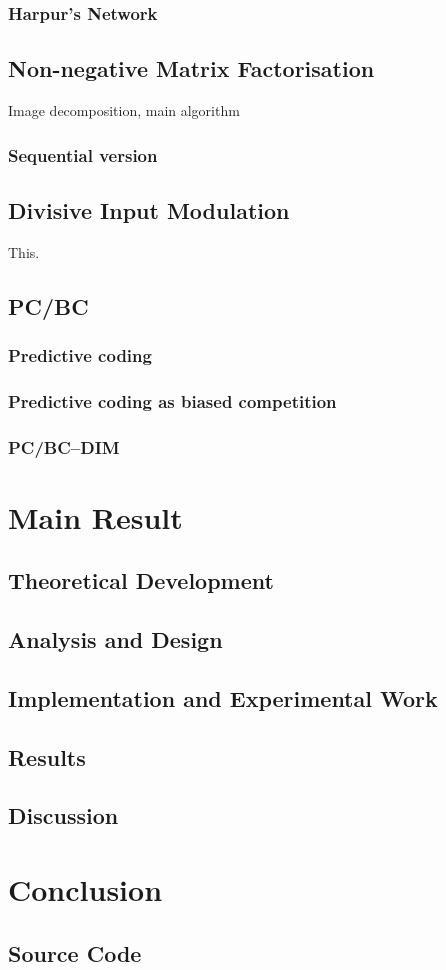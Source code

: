\documentclass[11pt,a4paper]{report}
\begin{document}
			\subsection{Harpur's Network}
	
		\section{Non-negative Matrix Factorisation}
		Image decomposition, main algorithm
			\subsection{Sequential version}
	
		\section{Divisive Input Modulation}
		This.

		\section{PC/BC}
			\subsection{Predictive coding}
			\subsection{Predictive coding as biased competition}
			\subsection{PC/BC--DIM}
			
	
	\chapter{Main Result}
		\section{Theoretical Development}
		\section{Analysis and Design}
		\section{Implementation and Experimental Work}
		\section{Results}
		\section{Discussion}
		
	\chapter{Conclusion}
	
	
	
	\nocite{*}
	
	\begin{appendices}
		\chapter{Source Code}
	\end{appendices}
\end{document}

